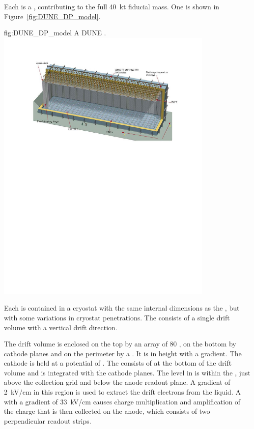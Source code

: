 Each  is a \nominalmodsize {}, contributing
to the full \SI{40}{\kilo\tonne}  fiducial mass.  One
\nominalmodsize {} is shown in
Figure~\ref{fig:DUNE_DP_model}.
\begin{dunefigure}{fig:DUNE_DP_model} {A \nominalmodsize DUNE   .}
  \includegraphics[width=0.8\textwidth]{graphics/DP-overview}
\end{dunefigure} 

Each  is contained in a cryostat with the same internal
dimensions as the , but with some variations in cryostat
penetrations.  The  consists of a single drift volume
with a vertical drift direction.

The drift volume is enclosed on the top by an array of \num{80}
, on the bottom by cathode planes and on the perimeter by
a . It is \dpmaxdrift in height with a \dpnominaldriftfield
gradient. The cathode is held at a potential of
\dptargetdriftvoltneg{}.  The   consists of
\dpnumpmtch {} at the bottom of the drift volume and is
integrated with the cathode planes.  The  level in
 is within the , just above the collection
grid and below the anode readout plane. A gradient of
\SI{2}{\kilo\volt/\centi\meter} in this region is used to extract the
drift electrons from the liquid. A  with a gradient of
\SI{33}{\kilo\volt/\centi\meter} causes charge multiplication and
amplification of the charge that is then collected on the anode, 
which consists of two perpendicular %
readout strips.

